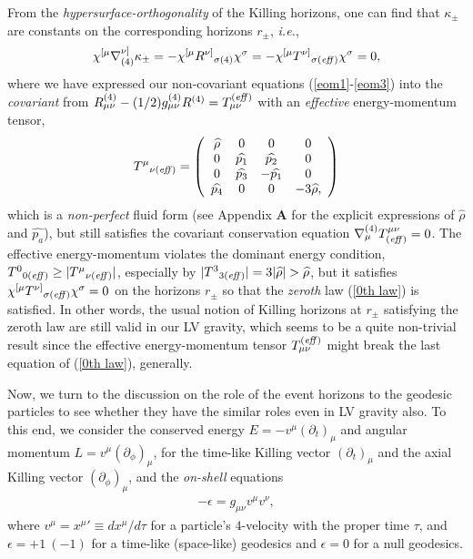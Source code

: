 \documentclass[preprint,aps,tightenlines,showkeys,nofootinbib,superscriptaddress]{revtex4}
\newcommand{\beq}{\begin{eqnarray}}
\newcommand{\eeq}{\end{eqnarray}}
\newcommand{\ep}{{\epsilon}}
\newcommand{\ka}{\kappa}
\newcommand{\m}{{\mu}}
\newcommand{\n}{{\nu}}
\newcommand{\si}{{\sigma}}
\newcommand{\Om}{{\Omega}}
\begin{document}
From the {\it hypersurface-orthogonality} of the Killing horizons, one can find that $\ka_{\pm}$ are constants on the corresponding horizons $r_{\pm}$, {\it i.e.},
\beq
\chi^{[ \m} \nabla^{\n ]}_{(4)} \ka_{\pm}=-\chi^{[ \m} {R^{\n ]}}_{ \si (4)} \chi^{\si}= -\chi^{[ \m} {T^{\n ]}}_{\si ({\it eff}) } \chi^{\si}=0,
\label{0th law}
\eeq
where we have expressed our non-covariant equations (\ref{eom1}-\ref{eom3}) into
the {\it covariant} from
$R_{\m \n}^{(4)} -(1/2) g_{\m \n}^{(4)} R^{(4)}=T_{\m \n}^{({\it eff})}$ with
an {\it effective} energy-momentum tensor,
\beq
{{T}^{\m}}_{\n (\it{eff})}=\left( \begin{array}{cccc}
\widehat{\rho} & 0 & 0 & 0 \\
0 & \widehat{p_1} & \widehat{p_2} &0 \\
0 & \widehat{p_3} & -\widehat{p_1} & 0 \\
\widehat{p_4} & 0 & 0 & -3 \widehat{\rho},
\label{T_eff}
\end{array}\right)
\eeq
which is a {\it non-perfect} fluid form
(see Appendix {\bf A} for the explicit expressions of $\widehat{\rho}$ and $\widehat{p_a}$),
but still satisfies the covariant conservation equation $\nabla_{\m}^{(4)} T^{\m \n}_{({\it eff})}=0$.
The effective energy-momentum violates the dominant energy condition,
${T^{0}}_{ 0 (\it{eff})}\geq | {T^{\m}}_{\n (\it{eff})}|$, especially by $|{T^{3}}_{3 (\it{eff})}|=3 |\widehat{\rho}|>\widehat{\rho}$, but it satisfies $\chi^{[ \m}{T^{\n ]}}_{\si (\it{eff})} \chi^{\si}=0$
on the horizons $r_{\pm}$ so that the {\it zeroth} law (\ref{0th law}) is satisfied. In other words, the usual notion of Killing horizons at $r_{\pm}$ satisfying the zeroth law are still valid in our LV gravity, which seems to be a quite non-trivial result since the effective energy-momentum tensor $T_{\m \n}^{(\it{eff})}$ might break the last equation of (\ref{0th law}), generally.

Now, we turn to the discussion on the role of the event horizons to the geodesic particles to see whether they have the similar roles even in LV gravity also. To this end, we consider the conserved energy $E=-v^{\m} (\partial_t)_\m$ and angular momentum $L=v^{\m} (\partial_{\phi})_\m$, for the time-like Killing vector $(\partial_t)_\m$ and the axial Killing vector $(\partial_{\phi})_\m$, and the {\it on-shell} equations
\beq
-\ep =g_{\m \n} v^{\m} v^{\n},
\label{geodesic}
\eeq
where $v^{\m} ={x^{\m}}'
\equiv d x^{\m}/ d \tau$ for a particle's $4$-velocity with the proper time $\tau$, and $\ep=+1~ (-1)$ for a time-like (space-like) geodesics and $\ep=0$ for a null geodesics.
\end{document}
